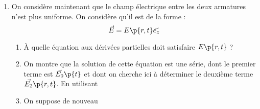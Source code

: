 \documentclass[a4paper,french,bookmarks]{article}
\begin{document}
\begin{enumerate}
        \item On considère maintenant que le champ électrique entre les deux armatures n'est plus uniforme. On considère qu'il est de la forme :
        \[ \vec E = E\p{r, t}\vec{e_z} \]
        
        \begin{enumerate}
            \item À quelle équation aux dérivées partielles doit satisfaire $E\p{r, t}$ ?
            
            \item On montre que la solution de cette équation est une série, dont le premier terme est $\vec{E_0}\p{t}$ et dont on cherche ici à déterminer le deuxième terme $\vec{E_2}\p{r, t}$. En utilisant 
            
            \item On suppose de nouveau 
        \end{enumerate}
        
    \end{enumerate}
    
\end{document}
